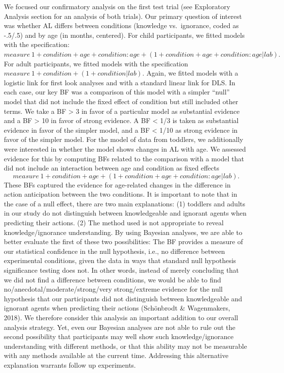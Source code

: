 \documentclass[
  english,
  man,floatsintext]{apa6}
\begin{document}
We focused our confirmatory analysis on the first test trial (see Exploratory Analysis section for an analysis of both trials). Our primary question of interest was whether AL differs between conditions (knowledge vs.~ignorance, coded as -.5/.5) and by age (in months, centered). For child participants, we fitted models with the specification:
\(measure ~ 1 + condition + age + condition:age + (1 + condition + age + condition:age | lab).\)
For adult participants, we fitted models with the specification
\(measure ~ 1 + condition + (1 + condition | lab).\)
Again, we fitted models with a logistic link for first look analyses and with a standard linear link for DLS.
In each case, our key BF was a comparison of this model with a simpler ``null'' model that did not include the fixed effect of condition but still included other terms. We take a BF \textgreater{} 3 in favor of a particular model as substantial evidence and a BF \textgreater{} 10 in favor of strong evidence. A BF \textless{} 1/3 is taken as substantial evidence in favor of the simpler model, and a BF \textless{} 1/10 as strong evidence in favor of the simpler model.
For the model of data from toddlers, we additionally were interested in whether the model shows changes in AL with age. We assessed evidence for this by computing BFs related to the comparison with a model that did not include an interaction between age and condition as fixed effects
\[measure ~ 1 + condition + age + (1 + condition + age + condition:age | lab).\]
These BFs captured the evidence for age-related changes in the difference in action anticipation between the two conditions.
It is important to note that in the case of a null effect, there are two main explanations: (1) toddlers and adults in our study do not distinguish between knowledgeable and ignorant agents when predicting their actions. (2) The method used is not appropriate to reveal knowledge/ignorance understanding. By using Bayesian analyses, we are able to better evaluate the first of these two possibilities: The BF provides a measure of our statistical confidence in the null hypothesis, i.e., no difference between experimental conditions, given the data in ways that standard null hypothesis significance testing does not. In other words, instead of merely concluding that we did not find a difference between conditions, we would be able to find no/anecdotal/moderate/strong/very strong/extreme evidence for the null hypothesis that our participants did not distinguish between knowledgeable and ignorant agents when predicting their actions (Schönbrodt \& Wagenmakers, 2018). We therefore consider this analysis an important addition to our overall analysis strategy. Yet, even our Bayesian analyses are not able to rule out the second possibility that participants may well show such knowledge/ignorance understanding with different methods, or that this ability may not be measurable with any methods available at the current time. Addressing this alternative explanation warrants follow up experiments.
\end{document}
